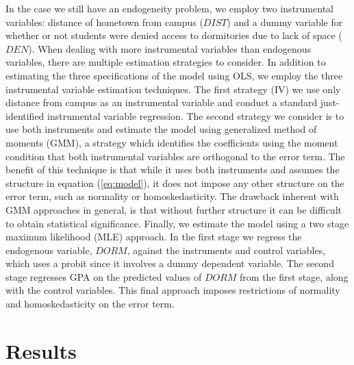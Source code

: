 \documentclass[12pt]{article}
\begin{document}
In the case we still have an endogeneity problem, we employ two instrumental variables: distance of hometown from campus ($DIST$) and a dummy variable for whether or not students were denied access to dormitories due to lack of space ($DEN$).  When dealing with more instrumental variables than endogenous variables, there are multiple estimation strategies to consider.  In addition to estimating the three specifications of the model using OLS, we employ the three instrumental variable estimation techniques.  The first strategy (IV) we use only distance from campus as an instrumental variable and conduct a standard just-identified instrumental variable regression.  The second strategy we consider is to use both instruments and estimate the model using generalized method of moments (GMM), a strategy which identifies the coefficients using the moment condition that both instrumental variables are orthogonal to the error term.  The benefit of this technique is that while it uses both instruments and assumes the structure in equation (\ref{eq:model}), it does not impose any other structure on the error term, such as normality or homoskedasticity.  The drawback inherent with GMM approaches in general, is that without further structure it can be difficult to obtain statistical significance.  Finally, we estimate the model using a two stage maximum likelihood (MLE) approach.  In the first stage we regress the endogenous variable, $DORM$, against the instruments and control variables, which uses a probit since it involves a dummy dependent variable.  The second stage regresses GPA on the predicted values of $DORM$ from the first stage, along with the control variables.  This final approach imposes restrictions of normality and homoskedasticity on the error term.

\section{Results}
\end{document}
